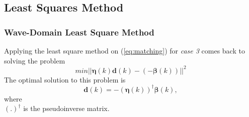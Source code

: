 \subsection{Least Squares Method}

\subsubsection{Wave-Domain Least Square Method}
Applying the least square method on (\ref{eq:matching}) for \textit{case 3} comes back to solving the problem
\begin{equation}
    min||\boldsymbol{\eta}(k)\boldsymbol{d}(k)-(-\boldsymbol{\beta}(k))||^2
\end{equation}
The optimal solution to this problem is\cite{Zhang2019}
\begin{equation}
    \boldsymbol{d}(k) = -(\boldsymbol{\eta}(k))^\dagger\boldsymbol{\beta}(k),
\end{equation}
where\\
$(.)^\dagger$ is the pseudoinverse matrix.
